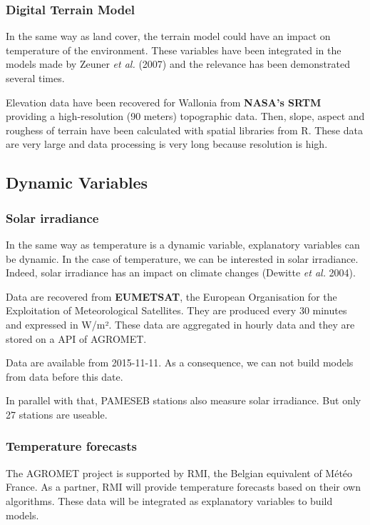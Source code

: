 \documentclass[12pt,twoside]{reedthesis}
\theoremstyle{definition}
\theoremstyle{definition}
\theoremstyle{definition}
\theoremstyle{remark}
\begin{document}
\subsubsection{Digital Terrain Model}\label{digital-terrain-model}

In the same way as land cover, the terrain model could have an impact on
temperature of the environment. These variables have been integrated in
the models made by Zeuner \emph{et al.} (2007) and the relevance has
been demonstrated several times.

Elevation data have been recovered for Wallonia from \textbf{NASA's
SRTM} providing a high-resolution (90 meters) topographic data. Then,
slope, aspect and roughess of terrain have been calculated with spatial
libraries from R. These data are very large and data processing is very
long because resolution is high.

\subsection{Dynamic Variables}\label{dynamic-variables}

\subsubsection{Solar irradiance}\label{solar-irradiance}

In the same way as temperature is a dynamic variable, explanatory
variables can be dynamic. In the case of temperature, we can be
interested in solar irradiance. Indeed, solar irradiance has an impact
on climate changes (Dewitte \emph{et al.} 2004).

Data are recovered from \textbf{EUMETSAT}, the European Organisation for
the Exploitation of Meteorological Satellites. They are produced every
30 minutes and expressed in W/m². These data are aggregated in hourly
data and they are stored on a API of AGROMET.

Data are available from 2015-11-11. As a consequence, we can not build
models from data before this date.

In parallel with that, PAMESEB stations also measure solar irradiance.
But only 27 stations are useable.

\subsubsection{Temperature forecasts}\label{temperature-forecasts}

The AGROMET project is supported by RMI, the Belgian equivalent of Météo
France. As a partner, RMI will provide temperature forecasts based on
their own algorithms. These data will be integrated as explanatory
variables to build models.
\end{document}
